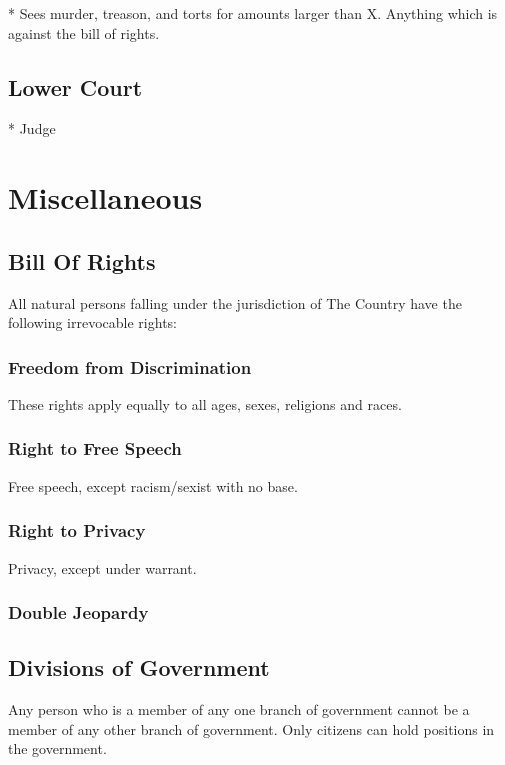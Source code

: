 \documentclass[a4paper]{report}
\begin{document}
* Sees murder, treason, and torts for amounts larger than X. Anything which is against the bill of rights.

\section{Lower Court}

* Judge

\chapter{Miscellaneous}

\section{Bill Of Rights}

All natural persons falling under the jurisdiction of The Country have the 
following irrevocable rights:

\subsection{Freedom from Discrimination}

These rights apply equally to all ages, sexes, religions and races.

\subsection{Right to Free Speech}

Free speech, except racism/sexist with no base.

\subsection{Right to Privacy}

Privacy, except under warrant.

\subsection{Double Jeopardy}

\section{Divisions of Government}

Any person who is a member of any one branch of government cannot be a member of any other branch of government. Only citizens can hold positions in the government.
\end{document}
